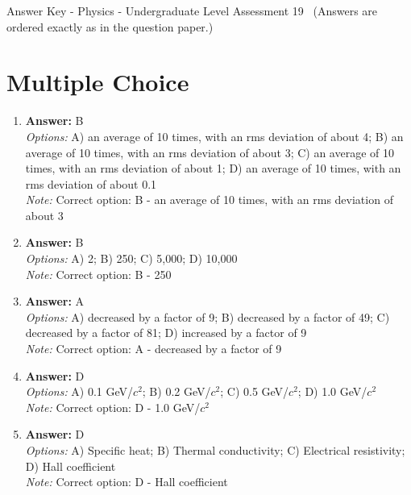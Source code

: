 \documentclass[12pt]{article}
\begin{document}
\begin{center}
Answer Key - Physics - Undergraduate Level Assessment 19 \
\small (Answers are ordered exactly as in the question paper.)
\end{center}

\section*{Multiple Choice}
\begin{enumerate}[label=\arabic*.]
\item \textbf{Answer:} B
\\ \textit{Options:} A) an average of 10 times, with an rms deviation of about 4; B) an average of 10 times, with an rms deviation of about 3; C) an average of 10 times, with an rms deviation of about 1; D) an average of 10 times, with an rms deviation of about 0.1
\\ \textit{Note:} Correct option: B - an average of 10 times, with an rms deviation of about 3
\item \textbf{Answer:} B
\\ \textit{Options:} A) 2; B) 250; C) 5,000; D) 10,000
\\ \textit{Note:} Correct option: B - 250
\item \textbf{Answer:} A
\\ \textit{Options:} A) decreased by a factor of 9; B) decreased by a factor of 49; C) decreased by a factor of 81; D) increased by a factor of 9
\\ \textit{Note:} Correct option: A - decreased by a factor of 9
\item \textbf{Answer:} D
\\ \textit{Options:} A) 0.1 GeV/$c^2$; B) 0.2 GeV/$c^2$; C) 0.5 GeV/$c^2$; D) 1.0 GeV/$c^2$
\\ \textit{Note:} Correct option: D - 1.0 GeV/$c^2$
\item \textbf{Answer:} D
\\ \textit{Options:} A) Specific heat; B) Thermal conductivity; C) Electrical resistivity; D) Hall coefficient
\\ \textit{Note:} Correct option: D - Hall coefficient
\end{enumerate}
\end{document}
